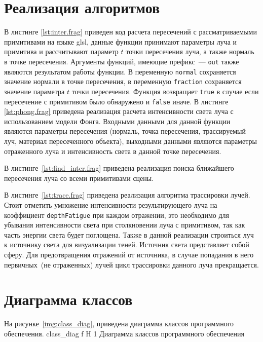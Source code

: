 \section{Реализация алгоритмов}
В листинге \ref{lst:inter.frag} приведен код расчета пересечений с рассматриваемыми примитивами на языке glsl, данные функции принимают
параметры луча и примитива  и рассчитывают параметр $t$ точки пересечения луча, а также нормаль   в точке пересечения.
Аргументы функций, имеющие префикс~--- \texttt{out} также являются результатом работы функции.
В переменную \texttt{normal} сохраняется значение нормали в точке пересечения, в переменную \texttt{fraction} сохраняется 
значение параметра $t$ точки пересечения. Функция возвращает \texttt{true} в случае если пересечение с примитивом было обнаружено и \texttt{false}
иначе. 
В листинге \ref{lst:phong.frag} приведена реализация  расчета интенсивности света 
луча с использованием модели Фонга. Входными данными для данной функции являются параметры пересечения (нормаль, точка пересечения, трассируемый луч, 
материал пересеченного объекта), выходными данными являются параметры отраженного луча  и интенсивность света в данной точке пересечения.

В листинге~\ref{lst:find_inter.frag} приведена реализация  поиска ближайшего пересечения луча со всеми  примитивами сцены.

В листинге~\ref{lst:trace.frag}  приведена реализация алгоритма трассировки лучей. 
Стоит отметить умножение интенсивности результирующего луча на 
коэффициент \texttt{depthFatigue}
при каждом отражении, это необходимо для убывания интенсивности света при  столкновении луча  с примитивом,
так как часть энергии света будет поглощена. Также в данной реализации строиться луч к источнику света для
визуализации теней. Источник света представляет собой сферу. Для предотвращения отражений от источника, в случае попадания в него первичных~(не отраженных)
лучей цикл трассировки данного луча прекращается.

\section{Диаграмма классов}
На рисунке~\ref{img:class_diag}, приведена диаграмма классов программного обеспечения.
{class_diag} %
{f} %
{H} %
{1\textwidth} %
{Диаграмма классов программного обеспечения} %



